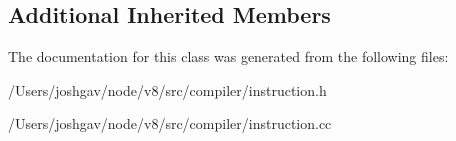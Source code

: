 \subsection*{Additional Inherited Members}


The documentation for this class was generated from the following files\+:\begin{DoxyCompactItemize}
\item 
/\+Users/joshgav/node/v8/src/compiler/instruction.\+h\item 
/\+Users/joshgav/node/v8/src/compiler/instruction.\+cc\end{DoxyCompactItemize}
